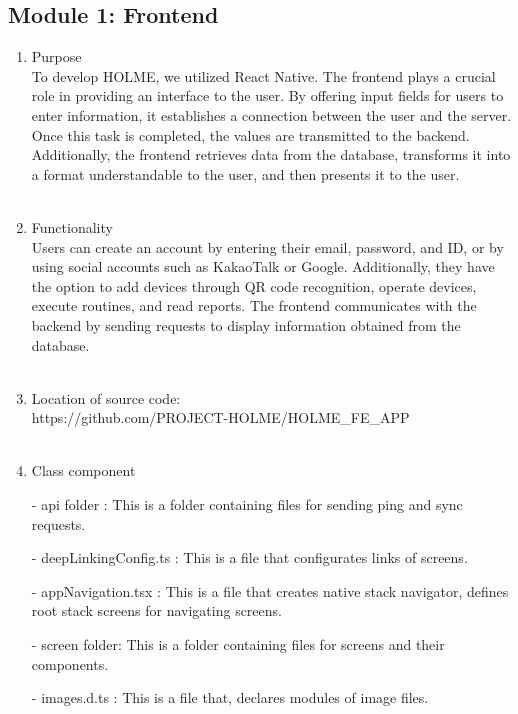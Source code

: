 \documentclass[conference]{IEEEtran}
\begin{document}
\subsection{Module 1: Frontend}
\begin{enumerate}
    \item Purpose\\
    To develop HOLME, we utilized React Native. The frontend plays a crucial role in providing an interface to the user. By offering input fields for users to enter information, it establishes a connection between the user and the server. Once this task is completed, the values are transmitted to the backend. Additionally, the frontend retrieves data from the database, transforms it into a format understandable to the user, and then presents it to the user.\\ \\
    \item Functionality\\
Users can create an account by entering their email, password, and ID, or by using social accounts such as KakaoTalk or Google. Additionally, they have the option to add devices through QR code recognition, operate devices, execute routines, and read reports. The frontend communicates with the backend by sending requests to display information obtained from the database.\\ \\
    \item Location of source code:\\ https://github.com/PROJECT-HOLME/HOLME\_FE\_APP \\ \\
    \item Class component
        \item[-] api folder : This is a folder containing files for sending ping and sync requests.\\
        \item[-] deepLinkingConfig.ts : This is a file that configurates links of screens.\\
        \item[-] appNavigation.tsx : This is a file that creates native stack navigator, defines root stack screens for navigating screens.\\
        \item[-] screen folder: This is a folder containing files for screens and their components.\\
        \item[-] images.d.ts : This is a file that, declares modules of image files. \\

\end{enumerate}
\end{document}
